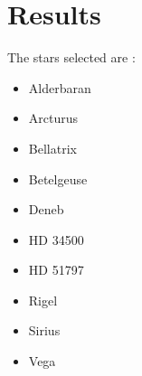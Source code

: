 \documentclass[letterpaper,11pt]{report}
\begin{document}
\newpage

\section{Results}

The stars selected are :
\begin{itemize}
    \item Alderbaran
    \item Arcturus
    \item Bellatrix
    \item Betelgeuse
    \item Deneb
    \item HD 34500
    \item HD 51797
    \item Rigel
    \item Sirius
    \item Vega
\end{itemize}

\newline 
\end{document}
